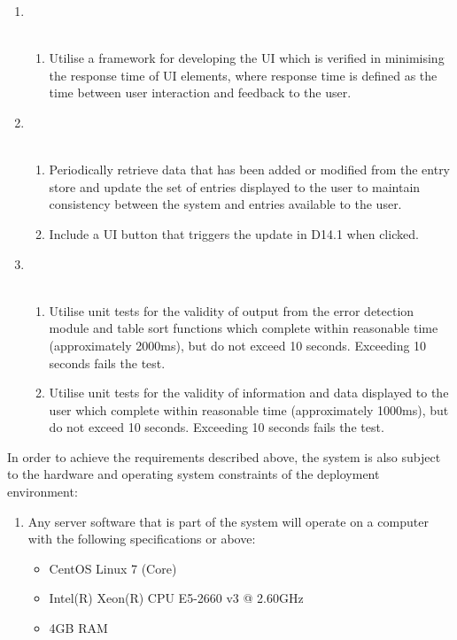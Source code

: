 \documentclass[8pt]{extarticle}
\begin{document}
\begin{enumerate}[label=C\arabic*]
\item \\\
\begin{enumerate}[label=D13.\arabic*]
\item Utilise a framework for developing the UI which is verified in minimising the response time of UI elements, where response time is defined as the time between user interaction and feedback to the user.  
\end{enumerate}

\item \\\
\begin{enumerate}[label=D14.\arabic*]
\item Periodically retrieve data that has been added or modified from the entry store and update the set of entries displayed to the user to maintain consistency between the system and entries available to the user. 

\item Include a UI button that triggers the update in D14.1 when clicked. 
\end{enumerate}

\item \\\
\begin{enumerate}[label=D15.\arabic*]
\item Utilise unit tests for the validity of output from the error detection module and table sort functions which complete within reasonable time (approximately 2000ms), but do not exceed 10 seconds. Exceeding 10 seconds fails the test. 

\item Utilise unit tests for the validity of information and data displayed to the user which complete within reasonable time (approximately 1000ms), but do not exceed 10 seconds. Exceeding 10 seconds fails the test. 
\end{enumerate}
\end{enumerate}

In order to achieve the requirements described above, the system is also subject to the hardware and operating system constraints of the deployment environment: 

\begin{enumerate}[label=]
\begin{enumerate}[label=D16.\arabic*]
\item Any server software that is part of the system will operate on a computer with the following specifications or above: 

\begin{itemize}
\item CentOS Linux 7 (Core)
\item Intel(R) Xeon(R) CPU E5-2660 v3 @ 2.60GHz
\item 4GB RAM
\end{itemize}
\end{enumerate}
\end{enumerate}
\end{document}
